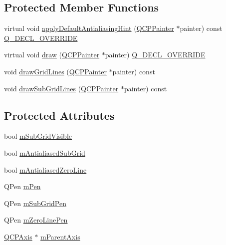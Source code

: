\subsection*{Protected Member Functions}
\begin{DoxyCompactItemize}
\item 
virtual void \hyperlink{class_q_c_p_grid_a64fa48e16b4629f5df2a5029ab6e761c}{apply\+Default\+Antialiasing\+Hint} (\hyperlink{class_q_c_p_painter}{Q\+C\+P\+Painter} $\ast$painter) const \hyperlink{qcustomplot_8h_a42cc5eaeb25b85f8b52d2a4b94c56f55}{Q\+\_\+\+D\+E\+C\+L\+\_\+\+O\+V\+E\+R\+R\+I\+DE}
\item 
virtual void \hyperlink{class_q_c_p_grid_aad9a312d998e2d170956334d4cb80be2}{draw} (\hyperlink{class_q_c_p_painter}{Q\+C\+P\+Painter} $\ast$painter) \hyperlink{qcustomplot_8h_a42cc5eaeb25b85f8b52d2a4b94c56f55}{Q\+\_\+\+D\+E\+C\+L\+\_\+\+O\+V\+E\+R\+R\+I\+DE}
\item 
void \hyperlink{class_q_c_p_grid_aee4e95d54acabbe298d6dda0dd86c0a4}{draw\+Grid\+Lines} (\hyperlink{class_q_c_p_painter}{Q\+C\+P\+Painter} $\ast$painter) const
\item 
void \hyperlink{class_q_c_p_grid_a751ce8aef815bcc9193432a30c8b6b6e}{draw\+Sub\+Grid\+Lines} (\hyperlink{class_q_c_p_painter}{Q\+C\+P\+Painter} $\ast$painter) const
\end{DoxyCompactItemize}
\subsection*{Protected Attributes}
\begin{DoxyCompactItemize}
\item 
bool \hyperlink{class_q_c_p_grid_a4e4a0400d6319bb44c06341f6298c87b}{m\+Sub\+Grid\+Visible}
\item 
bool \hyperlink{class_q_c_p_grid_a71b7051f833f0c5de3094998d6afdd87}{m\+Antialiased\+Sub\+Grid}
\item 
bool \hyperlink{class_q_c_p_grid_a8c0df56ae86440408c050895dcdb922b}{m\+Antialiased\+Zero\+Line}
\item 
Q\+Pen \hyperlink{class_q_c_p_grid_a1cdc4a3bccf6a40c2d4360def9fefa40}{m\+Pen}
\item 
Q\+Pen \hyperlink{class_q_c_p_grid_aa9004bc139ad3ea92629f0aaae81d83f}{m\+Sub\+Grid\+Pen}
\item 
Q\+Pen \hyperlink{class_q_c_p_grid_a379481871f17655c27eda30af233554f}{m\+Zero\+Line\+Pen}
\item 
\hyperlink{class_q_c_p_axis}{Q\+C\+P\+Axis} $\ast$ \hyperlink{class_q_c_p_grid_a9a8a76731e6e737b65b929fd1995cc88}{m\+Parent\+Axis}
\end{DoxyCompactItemize}
